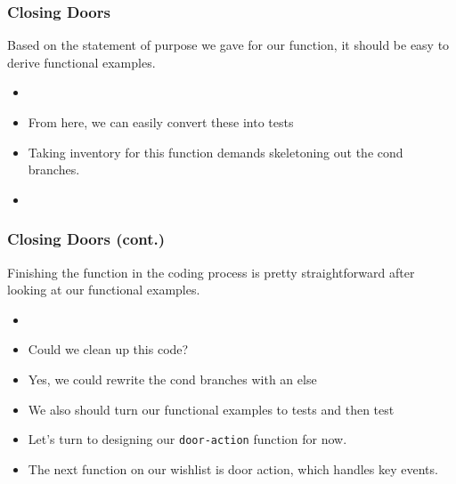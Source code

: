 \documentclass{beamer}
\begin{document}



\begin{frame}
  \frametitle{Closing Doors}
  Based on the statement of purpose we gave for our function, it should
  be easy to derive functional examples.
  \begin{itemize}
  \item<2-> \closeExamples
  \item<3-> From here, we can easily convert these into tests
  \item<4-> Taking inventory for this function demands skeletoning out
    the cond branches.
  \item<5-> \closeSkeleton
  \end{itemize}
\end{frame}


\begin{frame}
  \frametitle{Closing Doors (cont.)}
  Finishing the function in the coding process is pretty straightforward
  after looking at our functional examples.
  \begin{itemize}
  \item<2-> \closeFinal
  \item<3-> Could we clean up this code?
  \item<4-> Yes, we could rewrite the cond branches with an else
  \item<5-> We also should turn our functional examples to tests and then test
  \item<6-> Let's turn to designing our \texttt{door-action}
    function for now.
  \item<7-> The next function on our wishlist is door action, which handles
    key events. 
  \end{itemize}
\end{frame}
\end{document}
